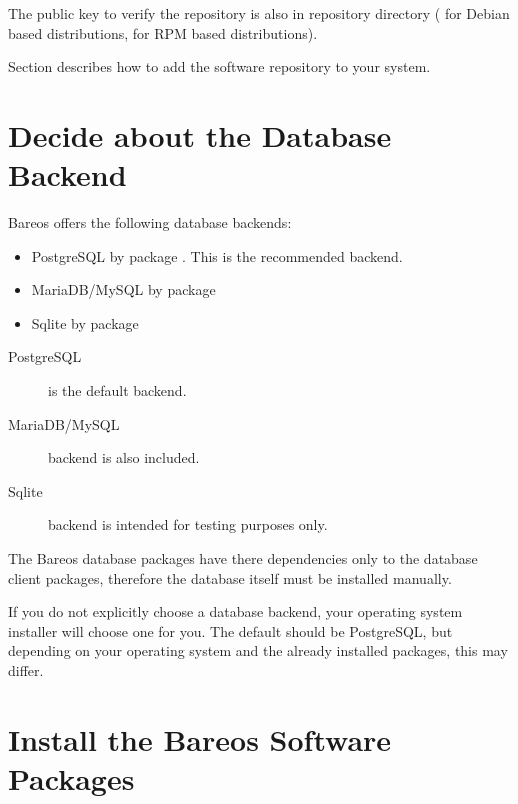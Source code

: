The public key to verify the repository is also in repository directory
( for Debian based distributions,  for RPM based distributions).

Section  describes how to add the software repository to your system.


\section{Decide about the Database Backend}
    \label{sec:ChooseDatabaseBackend}

Bareos offers the following database backends:
\begin{itemize}
    \item PostgreSQL by package . This is the recommended backend.
    \item MariaDB/MySQL by package 
    \item Sqlite by package  \\
\end{itemize}

\begin{description}
    \item[PostgreSQL] is the default backend.
    \item[MariaDB/MySQL] backend is also included.
    \item[Sqlite] backend is intended for testing purposes only.
\end{description}

The Bareos database packages have there dependencies only to the database client packages,
therefore the database itself must be installed manually.

If you do not explicitly choose a database backend, your operating system installer will choose one for you.
The default should be PostgreSQL, but depending on your operating system and the already installed packages,
this may differ.



\section{Install the Bareos Software Packages}
    \label{sec:InstallBareosPackages}


